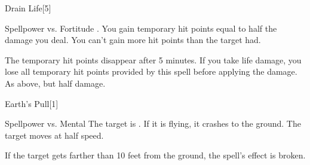 \begin{spellsection}{Drain Life}[5]
    \begin{spellheader}
    \end{spellheader}
    \begin{spellcontent}
        \begin{spelltargetinginfo}
        \end{spelltargetinginfo}
        \begin{spelleffects}
            \begin{spellattack}{Spellpower vs. Fortitude}
                \spellsuccess {}. You gain temporary hit points equal to half the damage you deal. You can't gain more hit points than the target had.
                
                The temporary hit points disappear after 5 minutes. If you take life damage, you lose all temporary hit points provided by this spell before applying the damage.
                \spellfailure As above, but half damage.
            \end{spellattack}
        \end{spelleffects}
    \end{spellcontent}
    \begin{spellfooter}
        \miscastrandom
    \end{spellfooter}
\end{spellsection}


\begin{spellsection}{Earth's Pull}[1]
    \begin{spellheader}
    \end{spellheader}
    \begin{spellcontent}
        \begin{spelltargetinginfo}
            \spellrng{\rngclose}
        \end{spelltargetinginfo}
        \begin{spelleffects}
            \begin{spellattack}{Spellpower vs. Mental}
                \spellsuccess The target is \immobilized. If it is flying, it crashes to the ground.
                \spellfailure The target moves at half speed.
            \end{spellattack}
            \spelldur \durshort
        \end{spelleffects}
    \end{spellcontent}
    \begin{spellfooter}
        \spellnotes If the target gets farther than 10 feet from the ground, the spell's effect is broken.
        \miscastrandom
    \end{spellfooter}
\end{spellsection}


